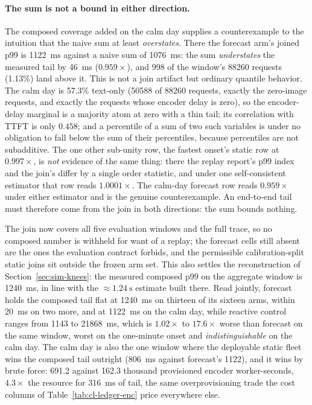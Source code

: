 \paragraph{The sum is not a bound in either direction.} The composed coverage
added on the calm day supplies a counterexample to the intuition that the naive
sum at least \emph{overstates}. There the forecast arm's joined p99 is
\SI{1122}{\milli\second} against a naive sum of \SI{1076}{\milli\second}: the
sum \emph{understates} the measured tail by \SI{46}{\milli\second}
($0.959\times$), and \num{998} of the window's \num{88260} requests (1.13\%)
land above it. This is not a join artifact but ordinary quantile
behavior. The calm day is 57.3\% text-only (\num{50588} of \num{88260}
requests, exactly the zero-image requests, and exactly the requests whose
encoder delay is zero), so the encoder-delay marginal is a majority atom at
zero with a thin tail; its correlation with TTFT is only $0.458$; and a
percentile of a sum of two such variables is under no obligation to fall below
the sum of their percentiles, because percentiles are not subadditive. The one
other sub-unity row, the fastest onset's static row at $0.997\times$, is
\emph{not} evidence of
the same thing: there the replay report's p99 index and the join's differ by a
single order statistic, and under one self-consistent estimator that row reads
$1.0001\times$. The calm-day forecast row reads $0.959\times$ under either
estimator and is the genuine counterexample. An end-to-end tail must therefore
come from the join in both directions: the sum bounds nothing.

The join now covers all five evaluation windows and the full trace, so no
composed number is withheld for want of a replay; the forecast cells still
absent are the ones the evaluation contract forbids, and the permissible
calibration-split static joins sit outside the frozen arm set. This also settles the
reconstruction of Section~\ref{sec:sim-knees}: the measured composed p99 on the
aggregate window is \SI{1240}{\milli\second}, in line with the
${\approx}\SI{1.24}{\second}$ estimate built there. Read jointly, forecast
holds the composed tail flat at \SI{1240}{\milli\second} on thirteen of its
sixteen arms, within \SI{20}{\milli\second} on two more, and at
\SI{1122}{\milli\second} on the calm day, while reactive control ranges from
\SI{1143}{} to \SI{21868}{\milli\second}, which is $1.02\times$ to
$17.6\times$ worse
than forecast on the same window, worst on the one-minute onset and
\emph{indistinguishable} on the calm day. The calm day is also the one window
where the deployable static fleet wins the composed tail outright
(\SI{806}{\milli\second} against forecast's \SI{1122}{}), and it wins by brute
force: 691.2 against 162.3 thousand provisioned encoder worker-seconds,
$4.3\times$ the resource for \SI{316}{\milli\second} of tail, the same
overprovisioning trade the cost columns of
Table~\ref{tab:cl-ledger-enc} price everywhere else.

